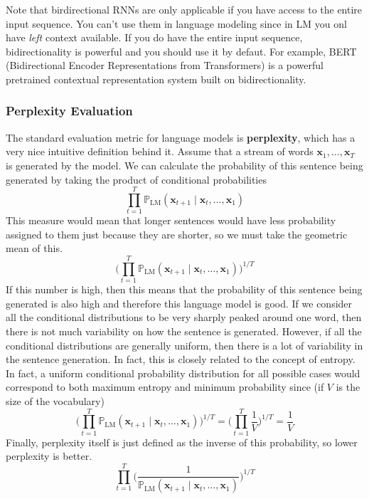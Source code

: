 \documentclass{article}
\begin{document}
      Note that birdirectional RNNs are only applicable if you have access to the entire input sequence. You can't use them in language modeling since in LM you onl have \textit{left} context available. If you do have the entire input sequence, bidirectionality is powerful and you should use it by defaut. For example, BERT (Bidirectional Encoder Representations from Transformers) is a powerful pretrained contextual representation system built on bidirectionality. 

    \subsubsection{Perplexity Evaluation} 

      The standard evaluation metric for language models is \textbf{perplexity}, which has a very nice intuitive definition behind it. Assume that a stream of words $\mathbf{x}_1, \ldots, \mathbf{x}_T$ is generated by the model. We can calculate the probability of this sentence being generated by taking the product of conditional probabilities 
      \[\prod_{t=1}^T \mathbb{P}_{\mathrm{LM}} (\mathbf{x}_{t+1} \mid \mathbf{x}_t, \ldots, \mathbf{x}_1)\]
      This measure would mean that longer sentences would have less probability assigned to them just because they are shorter, so we must take the geometric mean of this. 
      \[\bigg( \prod_{t=1}^T \mathbb{P}_{\mathrm{LM}} (\mathbf{x}_{t+1} \mid \mathbf{x}_t, \ldots, \mathbf{x}_1) \bigg)^{1/T}\]
      If this number is high, then this means that the probability of this sentence being generated is also high and therefore this language model is good. If we consider all the conditional distributions to be very sharply peaked around one word, then there is not much variability on how the sentence is generated. However, if all the conditional distributions are generally uniform, then there is a lot of variability in the sentence generation. In fact, this is closely related to the concept of entropy. In fact, a uniform conditional probability distribution for all possible cases would correspond to both maximum entropy and minimum probability since (if $V$ is the size of the vocabulary)
      \[\bigg( \prod_{t=1}^T \mathbb{P}_{\mathrm{LM}} (\mathbf{x}_{t+1} \mid \mathbf{x}_t, \ldots, \mathbf{x}_1) \bigg)^{1/T} = \bigg( \prod_{t=1}^T \frac{1}{V} \bigg)^{1/T} = \frac{1}{V}\]
      Finally, perplexity itself is just defined as the inverse of this probability, so lower perplexity is better. 
      \[\prod_{t=1}^T \bigg( \frac{1}{\mathbb{P}_{\mathrm{LM}} (\mathbf{x}_{t+1} \mid \mathbf{x}_t, \ldots, \mathbf{x}_1)} \bigg)^{1/T}\]
\end{document}

